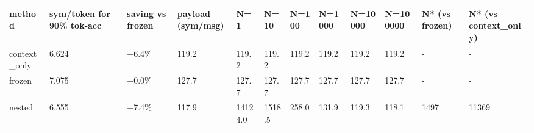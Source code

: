 \begin{tabular}{llllllllllll}
\hline
method & sym/token for 90\% tok-acc & saving vs frozen & payload (sym/msg) & N=1 & N=10 & N=100 & N=1000 & N=10000 & N=100000 & N* (vs frozen) & N* (vs context\_only) \\
\hline
context\_only & 6.624 & +6.4\% & 119.2 & 119.2 & 119.2 & 119.2 & 119.2 & 119.2 & 119.2 & - & - \\
frozen & 7.075 & +0.0\% & 127.7 & 127.7 & 127.7 & 127.7 & 127.7 & 127.7 & 127.7 & - & - \\
nested & 6.555 & +7.4\% & 117.9 & 14124.0 & 1518.5 & 258.0 & 131.9 & 119.3 & 118.1 & 1497 & 11369 \\
\hline
\end{tabular}
